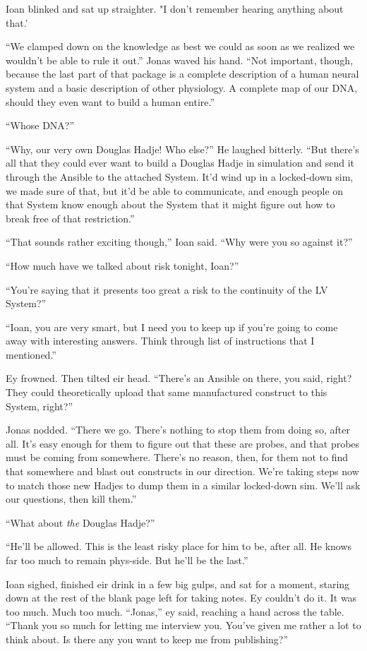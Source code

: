Ioan blinked and sat up straighter. "I don't remember hearing anything about that.'

``We clamped down on the knowledge as best we could as soon as we realized we wouldn't be able to rule it out.'' Jonas waved his hand. ``Not important, though, because the last part of that package is a complete description of a human neural system and a basic description of other physiology. A complete map of our DNA, should they even want to build a human entire.''

``Whose DNA?''

``Why, our very own Douglas Hadje! Who else?'' He laughed bitterly. ``But there's all that they could ever want to build a Douglas Hadje in simulation and send it through the Ansible to the attached System. It'd wind up in a locked-down sim, we made sure of that, but it'd be able to communicate, and enough people on that System know enough about the System that it might figure out how to break free of that restriction.''

``That sounds rather exciting though,'' Ioan said. ``Why were you so against it?''

``How much have we talked about risk tonight, Ioan?''

``You're saying that it presents too great a risk to the continuity of the LV System?''

``Ioan, you are very smart, but I need you to keep up if you're going to come away with interesting answers. Think through list of instructions that I mentioned.''

Ey frowned. Then tilted eir head. ``There's an Ansible on there, you said, right? They could theoretically upload that same manufactured construct to this System, right?''

Jonas nodded. ``There we go. There's nothing to stop them from doing so, after all. It's easy enough for them to figure out that these are probes, and that probes must be coming from somewhere. There's no reason, then, for them not to find that somewhere and blast out constructs in our direction. We're taking steps now to match those new Hadjes to dump them in a similar locked-down sim. We'll ask our questions, then kill them.''

``What about \emph{the} Douglas Hadje?''

``He'll be allowed. This is the least risky place for him to be, after all. He knows far too much to remain phys-side. But he'll be the last.''

Ioan sighed, finished eir drink in a few big gulps, and sat for a moment, staring down at the rest of the blank page left for taking notes. Ey couldn't do it. It was too much. Much too much. ``Jonas,'' ey said, reaching a hand across the table. ``Thank you so much for letting me interview you. You've given me rather a lot to think about. Is there any you want to keep me from publishing?''

